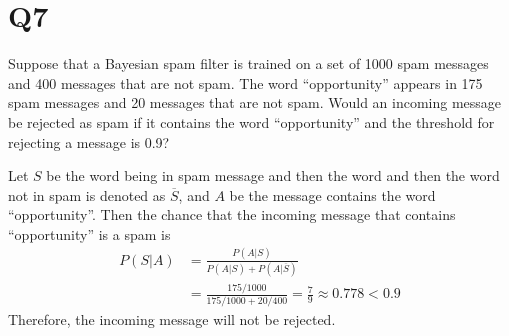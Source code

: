 \documentclass[11pt]{article}
\begin{document}
\section*{Q7}
Suppose that a Bayesian spam filter is trained on a set of 1000
spam messages and 400 messages that are not spam. The
word “opportunity” appears in 175 spam messages and 20
messages that are not spam. Would an incoming message be
rejected as spam if it contains the word “opportunity” and the
threshold for rejecting a message is 0.9?
\begin{solution}
    Let $S$ be the word being in spam message and then the word 
    and then the word not in spam is denoted as $\overline{S}$, and $A$ be the message contains the word ``opportunity''. Then the chance that the incoming message that contains ``opportunity'' is a spam is
    \begin{align*}
        P(S \vert A)&=\frac{P(A\vert S)}{P(A\vert S)+P(A\vert \overline{S})}\\
        &=\frac{175 / 1000}{175 / 1000 + 20 / 400}=\frac{7}{9}\approx  0.778<0.9
    \end{align*}
    Therefore, the incoming message will not be rejected.
\end{solution}
\end{document}
